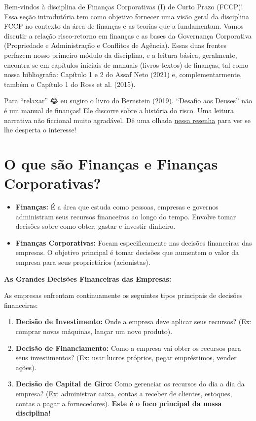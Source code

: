 \documentclass[
  a4paper,
]{book}
\begin{document}
Bem-vindos à disciplina de Finanças Corporativas (I) de Curto Prazo
(FCCP)! Essa seção introdutória tem como objetivo fornecer uma visão
geral da disciplina FCCP no contexto da área de finanças e as teorias
que a fundamentam. Vamos discutir a relação risco-retorno em finanças e
as bases da Governança Corporativa (Propriedade e Administração e
Conflitos de Agência). Essas duas frentes perfazem nosso primeiro módulo
da disciplina, e a leitura básica, geralmente, encontra-se em capítulos
iniciais de manuais (livros-textos) de finanças, tal como nossa
bibliografia: Capítulo 1 e 2 do Assaf Neto (2021) e, complementarmente,
também o Capítulo 1 do Ross et al. (2015).

Para ``relaxar'' 😂 eu sugiro o livro do Bernstein (2019). ``Desafio aos
Deuses'' não é um manual de finanças! Ele discorre sobre a história do
risco. Uma leitura narrativa não ficcional muito agradável. Dê uma
olhada
\href{https://medium.com/@fabiofigueiredo_44303/resenha-do-livro-desafio-aos-deuses-a-hist\%C3\%B3ria-do-risco-9607fab2aa30}{nessa
resenha} para ver se lhe desperta o interesse!

\section{\texorpdfstring{\textbf{O que são Finanças e Finanças
Corporativas?}}{O que são Finanças e Finanças Corporativas?}}\label{o-que-suxe3o-finanuxe7as-e-finanuxe7as-corporativas}

\begin{itemize}
\item
  \textbf{Finanças:} É a área que estuda como pessoas, empresas e
  governos administram seus recursos financeiros ao longo do tempo.
  Envolve tomar decisões sobre como obter, gastar e investir dinheiro.
\item
  \textbf{Finanças Corporativas:} Focam especificamente nas decisões
  financeiras das empresas. O objetivo principal é tomar decisões que
  aumentem o valor da empresa para seus proprietários (acionistas).
\end{itemize}

\textbf{As Grandes Decisões Financeiras das Empresas:}

As empresas enfrentam continuamente os seguintes tipos principais de
decisões financeiras:

\begin{enumerate}
\def\labelenumi{\arabic{enumi}.}
\item
  \textbf{Decisão de Investimento:} Onde a empresa deve aplicar seus
  recursos? (Ex: comprar novas máquinas, lançar um novo produto).
\item
  \textbf{Decisão de Financiamento:} Como a empresa vai obter os
  recursos para seus investimentos? (Ex: usar lucros próprios, pegar
  empréstimos, vender ações).
\item
  \textbf{Decisão de Capital de Giro:} Como gerenciar os recursos do dia
  a dia da empresa? (Ex: administrar caixa, contas a receber de
  clientes, estoques, contas a pagar a fornecedores). \textbf{Este é o
  foco principal da nossa disciplina!}
\end{enumerate}
\end{document}
